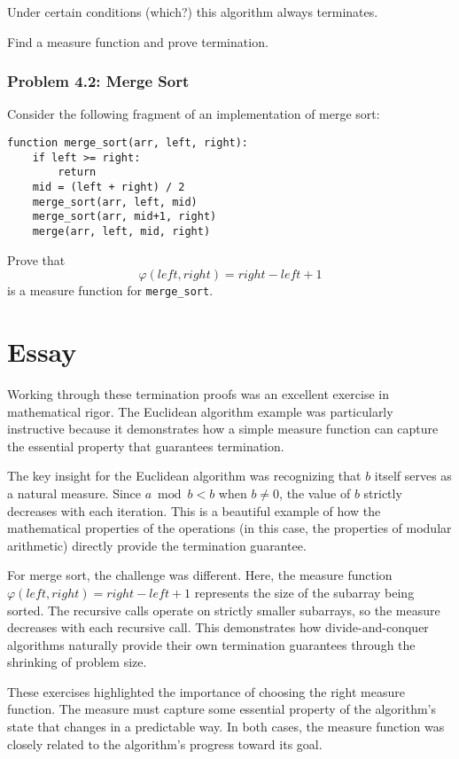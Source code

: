 \documentclass{article}
\theoremstyle{plain}
\theoremstyle{definition}
\theoremstyle{remark}
\begin{document}
Under certain conditions (which?) this algorithm always terminates.  

Find a measure function and prove termination.

\subsubsection{Problem 4.2: Merge Sort}

Consider the following fragment of an implementation of merge sort:

\begin{verbatim}
function merge_sort(arr, left, right):
    if left >= right:
        return
    mid = (left + right) / 2
    merge_sort(arr, left, mid)
    merge_sort(arr, mid+1, right)
    merge(arr, left, mid, right)
\end{verbatim}

Prove that
\[
    \varphi(left, right) = right - left + 1
\]
is a measure function for \texttt{merge\_sort}.

\section{Essay}

Working through these termination proofs was an excellent exercise in mathematical rigor. The Euclidean algorithm example was particularly instructive because it demonstrates how a simple measure function can capture the essential property that guarantees termination.

The key insight for the Euclidean algorithm was recognizing that $b$ itself serves as a natural measure. Since $a \bmod b < b$ when $b \neq 0$, the value of $b$ strictly decreases with each iteration. This is a beautiful example of how the mathematical properties of the operations (in this case, the properties of modular arithmetic) directly provide the termination guarantee.

For merge sort, the challenge was different. Here, the measure function $\varphi(left, right) = right - left + 1$ represents the size of the subarray being sorted. The recursive calls operate on strictly smaller subarrays, so the measure decreases with each recursive call. This demonstrates how divide-and-conquer algorithms naturally provide their own termination guarantees through the shrinking of problem size.

These exercises highlighted the importance of choosing the right measure function. The measure must capture some essential property of the algorithm's state that changes in a predictable way. In both cases, the measure function was closely related to the algorithm's progress toward its goal.
\end{document}
